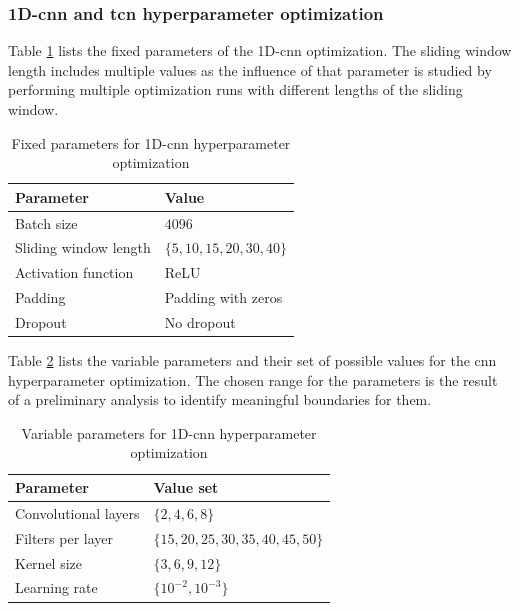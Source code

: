 \documentclass[conference]{IEEEtran}
\begin{document}
\subsubsection{1D-\gls{cnn} and \gls{tcn} hyperparameter optimization}
\label{sec:cnn_hyperparameter_optimization}

Table \ref{tab:fixed_parameters_cnn_optimization} lists the fixed parameters of the 1D-\gls{cnn} optimization. The sliding window length includes multiple values as the influence of that parameter is studied by performing multiple optimization runs with different lengths of the sliding window.

\begin{table}[htp]
	\centering
	\caption{Fixed parameters for 1D-\gls{cnn} hyperparameter optimization}
	\label{tab:fixed_parameters_cnn_optimization}
	\begin{tabular}{ll}
		\textbf{Parameter} & \textbf{Value} \\
		\hline
		Batch size & $ 4096 $ \\
		Sliding window length & $ \{5, 10, 15, 20, 30, 40\} $ \\
		Activation function & ReLU \\
		Padding & Padding with zeros \\
		Dropout & No dropout
	\end{tabular}
\end{table}

Table \ref{tab:variable_parameters_cnn_optimization} lists the variable parameters and their set of possible values for the \gls{cnn} hyperparameter optimization. The chosen range for the parameters is the result of a preliminary analysis to identify meaningful boundaries for them.

\begin{table}[htp]
	\centering
	\caption{Variable parameters for 1D-\gls{cnn} hyperparameter optimization}
	\label{tab:variable_parameters_cnn_optimization}
	\begin{tabular}{ll}
		\textbf{Parameter} & \textbf{Value set} \\
		\hline
		Convolutional layers & $ \{2, 4, 6, 8\} $ \\
		Filters per layer & $ \{15, 20, 25, 30, 35, 40, 45, 50\} $ \\
		Kernel size & $ \{3, 6, 9, 12\} $ \\
		Learning rate & $ \{10^{-2}, 10^{-3}\} $
	\end{tabular}
\end{table}
\end{document}
